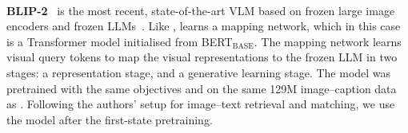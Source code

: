 \paragraph{}
\noindent\textbf{BLIP-2}~\cite{blip2} is the most recent, state-of-the-art VLM based on frozen large image encoders and frozen LLMs~\citep{opt,flan_t5}.
Like \clipcap, \bliptwo learns a mapping network, which in this case is a Transformer model initialised from BERT$_\text{BASE}$.
The mapping network learns visual query tokens to map the visual representations to the frozen LLM in two stages: a \vl representation stage, and a generative learning stage.
The model was pretrained with the same objectives and on the same 129M image--caption data as \blip.
Following the authors' setup for image--text retrieval and matching, we use the \bliptwo model after the first-state pretraining.

